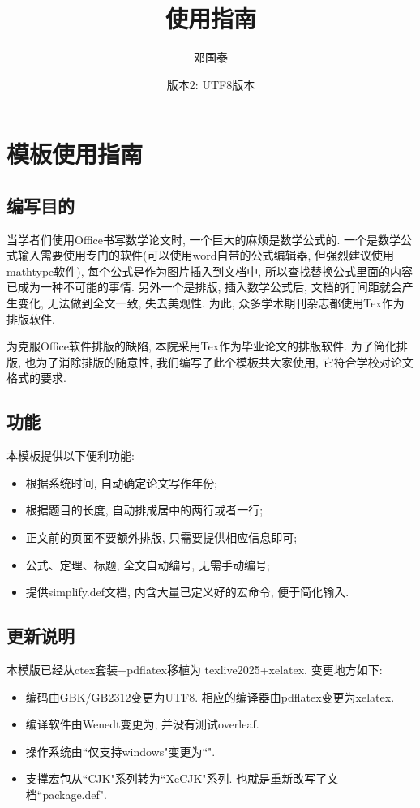 \documentclass[a4paper,12pt,twoside]{ctexart}
\begin{document}
\title{使用指南}
\date{版本2: UTF8版本}
\author{邓国泰}
\maketitle
{}\linespread{1.35}
\renewcommand{\baselinestretch}{1.5}
\baselineskip=23pt
\parskip=0pt

\section{模板使用指南}
\subsection{编写目的}
    当学者们使用Office书写数学论文时, 一个巨大的麻烦是数学公式的. 一个是数学公式输入需要使用专门的软件(可以使用word自带的公式编辑器, 但强烈建议使用mathtype软件), 每个公式是作为图片插入到文档中, 所以查找替换公式里面的内容已成为一种不可能的事情. 另外一个是排版, 插入数学公式后, 文档的行间距就会产生变化, 无法做到全文一致, 失去美观性. 为此, 众多学术期刊杂志都使用Tex作为排版软件.

    为克服Office软件排版的缺陷, 本院采用Tex作为毕业论文的排版软件.
    为了简化排版, 也为了消除排版的随意性, 我们编写了此个模板共大家使用, 它符合学校对论文格式的要求.

\subsection{功能}
    本模板提供以下便利功能:
    \begin{itemize}
      \item 根据系统时间, 自动确定论文写作年份;
      \item 根据题目的长度, 自动排成居中的两行或者一行;
      \item 正文前的页面不要额外排版, 只需要提供相应信息即可;
      \item 公式、定理、标题, 全文自动编号, 无需手动编号;
      \item 提供simplify.def文档, 内含大量已定义好的宏命令, 便于简化输入.
    \end{itemize}
\subsection{更新说明}
    本模版已经从ctex套装+pdflatex移植为 texlive2025+xelatex. 变更地方如下:
    \begin{itemize}
      \item 编码由GBK/GB2312变更为UTF8. 相应的编译器由pdflatex变更为xelatex.
      \item 编译软件由Wenedt变更为, 并没有测试overleaf.
      \item 操作系统由``仅支持windows"变更为``".
      \item 支撑宏包从``CJK"系列转为``XeCJK"系列. 也就是重新改写了文档``package.def".
    \end{itemize}
\end{document}
